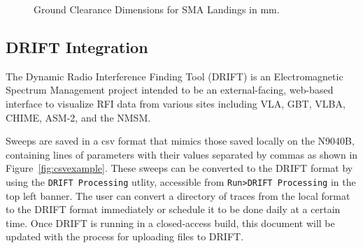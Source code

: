 \documentclass[titlepage]{article}
\begin{document}
\begin{figure}[!htb]
\begin{center}
  \end{center}
  \caption{Ground Clearance Dimensions for SMA Landings in mm.}\label{fig:sma}
\end{figure}

\subsection{DRIFT Integration}\label{sec:drift}
The Dynamic Radio Interference Finding Tool (DRIFT) is an Electromagnetic Spectrum Management project intended to be an external-facing, web-based interface to visualize RFI data from various sites including VLA, GBT, VLBA, CHIME, ASM-2, and the NMSM.\@

Sweeps are saved in a csv format that mimics those saved locally on the N9040B, containing lines of parameters with their values separated by commas as shown in Figure~\ref{fig:csvexample}. These sweeps can be converted to the DRIFT format by using the \verb|DRIFT Processing| utlity, accessible from \verb|Run>DRIFT Processing| in the top left banner. The user can convert a directory of traces from the local format to the DRIFT format immediately or schedule it to be done daily at a certain time. Once DRIFT is running in a closed-access build, this document will be updated with the process for uploading files to DRIFT.\@
\end{document}
